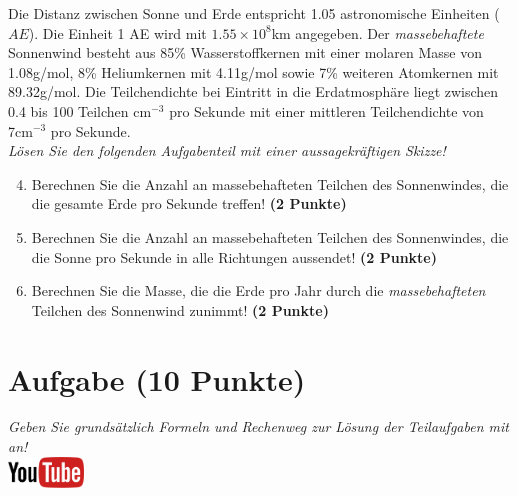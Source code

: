 \documentclass[a4paper, 9pt]{scrartcl}\usepackage[]{graphicx}\usepackage[]{xcolor}
\begin{document}
Die Distanz zwischen Sonne und Erde entspricht 1.05 astronomische Einheiten ($AE$). Die Einheit 1 AE wird mit \ensuremath{1.55\times 10^{8}}km angegeben. Der \textit{massebehaftete} Sonnenwind besteht aus 85\% Wasserstoffkernen mit einer molaren Masse von 1.08g/mol, 8\% Heliumkernen mit 4.11g/mol sowie 7\% weiteren Atomkernen mit  89.32g/mol. Die Teilchendichte bei Eintritt in die Erdatmosphäre liegt zwischen 0.4 bis 100 Teilchen cm$^{-3}$ pro Sekunde mit einer mittleren Teilchendichte von 7cm$^{-3}$ pro Sekunde. \\

\textit{Lösen Sie den folgenden Aufgabenteil mit einer aussagekräftigen Skizze!}

\begin{enumerate}
  \setcounter{enumi}{3}
\item Berechnen Sie die Anzahl an massebehafteten Teilchen des Sonnenwindes, die die gesamte Erde pro Sekunde treffen! \textbf{(2 Punkte)}
\item Berechnen Sie die Anzahl an massebehafteten Teilchen des Sonnenwindes, die die Sonne pro Sekunde in alle Richtungen aussendet! \textbf{(2 Punkte)}
\item Berechnen Sie die Masse, die die Erde pro Jahr durch die \textit{massebehafteten} Teilchen des Sonnenwind zunimmt! \textbf{(2 Punkte)}
\end{enumerate}


\clearpage

\section{Aufgabe \hfill (10 Punkte)}

\textit{Geben Sie grunds{\"a}tzlich Formeln und Rechenweg zur L{\"o}sung der
  Teilaufgaben mit an!} \\[1Ex]

\hfill\href{https://youtu.be/n451XnhtSh4}{\includegraphics[width = 2cm]{img/youtube}} %
\hspace{2Ex}
\end{document}
